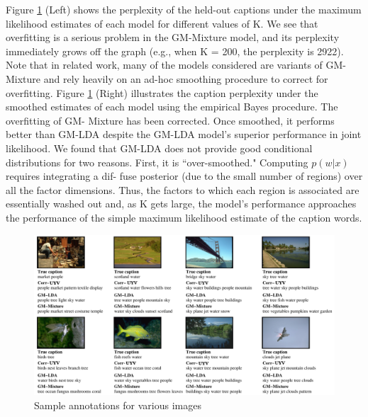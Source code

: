 Figure \ref{fig:uyv-fig} (Left) shows the perplexity of the held-out captions under the maximum likelihood estimates of each model for different values of K. We see that overfitting is a serious problem in the GM-Mixture model, and its perplexity immediately grows off the graph (e.g., when K = 200, the perplexity is 2922). Note that in related work, many of the models considered are variants of GM-Mixture and rely heavily on an ad-hoc smoothing procedure to correct for overfitting. Figure \ref{fig:uyv-fig} (Right) illustrates the caption perplexity under
the smoothed estimates of each model using the empirical Bayes procedure. The overfitting of GM- Mixture has been corrected. Once smoothed, it performs better than GM-LDA despite the GM-LDA model’s superior performance in joint likelihood. We found that GM-LDA does not provide good conditional distributions for two reasons. First, it is ``over-smoothed." Computing $p(w| x)$ requires integrating a dif- fuse posterior (due to the small number of regions) over all the factor dimensions. Thus, the factors to which each region is associated are essentially washed out and, as K gets large, the model’s performance approaches the performance of the simple maximum likelihood estimate of the caption words.

\begin{figure}
  \centering
    \hspace*{-1.5cm}\includegraphics[height=0.40\textheight]{plots/figs/Fig2.png}
  \caption{Sample annotations for various images}
  \label{fig:uyv-fig}
\end{figure}


